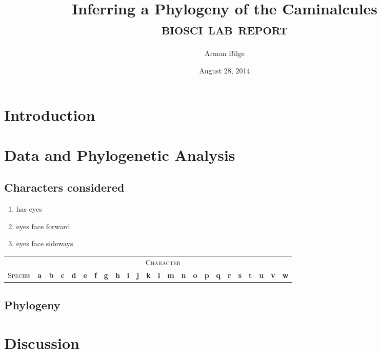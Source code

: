 \documentclass{article}
\title{Inferring a Phylogeny of the Caminalcules \\
       \Large\textsc{biosci \oldstylenums{210} lab report}}
\author{Arman Bilge}
\date{August 28, 2014}
\begin{document}
    \maketitle

    \section*{Introduction}

    \section*{Data and Phylogenetic Analysis}

        \subsection*{Characters considered}

            \begin{enumerate}[label=\textbf{(\alph*)}]
                \item has eyes
                \item eyes face forward
                \item eyes face sideways
            \end{enumerate}

            \begin{sidewaystable}
                \centering
                \begin{tabular}{r|rrrrrrrrrrrrrrrrrrrrrrr}
                    \toprule
                    & \multicolumn{23}{c}{\textsc{Character}} \\
                    \textsc{Species}
                        & \textbf{a}
                        & \textbf{b}
                        & \textbf{c}
                        & \textbf{d}
                        & \textbf{e}
                        & \textbf{f}
                        & \textbf{g}
                        & \textbf{h}
                        & \textbf{i}
                        & \textbf{j}
                        & \textbf{k}
                        & \textbf{l}
                        & \textbf{m}
                        & \textbf{n}
                        & \textbf{o}
                        & \textbf{p}
                        & \textbf{q}
                        & \textbf{r}
                        & \textbf{s}
                        & \textbf{t}
                        & \textbf{u}
                        & \textbf{v}
                        & \textbf{w} \\
                    \midrule
                    
                    \bottomrule
                \end{tabular}
            \end{sidewaystable}

        \subsection*{Phylogeny}

    \section*{Discussion}

    \printbibliography
\end{document}
